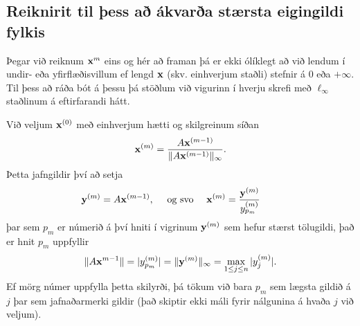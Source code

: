 \documentclass[letterpaper,10pt,icelandic]{sphinxmanual}
\begin{document}
\subsection{Reiknirit til þess að ákvarða stærsta eigingildi fylkis}
\label{kafli09:reiknirit-til-ess-a-akvara-staersta-eigingildi-fylkis}
Þegar við reiknum \({\mbox{${\bf x}$}}^{m}\) eins og hér að framan
þá er ekki ólíklegt að við lendum í undir- eða yfirflæðisvillum ef lengd
\({\mbox{${\bf x}$}}\) (skv. einhverjum staðli) stefnir á 0 eða
\(+\infty\). Til þess að ráða bót á þessu þá stöðlum við vigurinn í
hverju skrefi með \(\ell_\infty\) staðlinum á eftirfarandi hátt.

Við veljum \({\mbox{${\bf x}$}}^{(0)}\) með einhverjum hætti og
skilgreinum síðan
\begin{gather}
\begin{split}{\bf x}^{(m)} = \frac{A{\bf x}^{(m-1)}}{\|A{\bf x}^{(m-1)}\|_\infty}.\end{split}\notag
\end{gather}
Þetta jafngildir því að setja
\begin{gather}
\begin{split}{\mbox{${\bf y}$}}^{(m)}=A{\mbox{${\bf x}$}}^{(m-1)}, \quad \text{ og svo } \quad
{\mbox{${\bf x}$}}^{(m)}=\dfrac{{\mbox{${\bf y}$}}^{(m)}}{y_{p_m}^{(m)}} \qquad\end{split}\notag
\end{gather}
þar sem \(p_m\) er númerið á því hniti í vigrinum
\({\mbox{${\bf y}$}}^{(m)}\) sem hefur stærst tölugildi, það er hnit \(p_m\) uppfyllir
\begin{gather}
\begin{split}\|A{\bf x}^{m-1}\| = |y_{p_m}^{(m)}|=\|{\mbox{${\bf y}$}}^{(m)}\|_\infty=\max_{1\leq j\leq n}|y_j^{(m)}|.\end{split}\notag
\end{gather}
Ef mörg númer uppfylla þetta skilyrði, þá tökum við bara \(p_m\)
sem lægsta gildið á \(j\) þar sem jafnaðarmerki gildir (það skiptir ekki máli
fyrir nálgunina á hvaða \(j\) við veljum).
\end{document}
